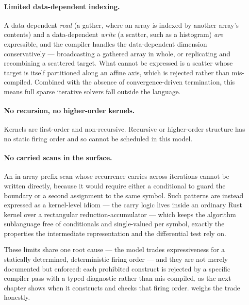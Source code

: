 \paragraph{Limited data-dependent indexing.} A data-dependent \emph{read} (a
gather, where an array is indexed by another array's contents) and a
data-dependent \emph{write} (a scatter, such as a histogram) \emph{are}
expressible, and the compiler handles the data-dependent dimension conservatively
--- broadcasting a gathered array in whole, or replicating and recombining a
scattered target. What cannot be expressed is a scatter whose target is itself
partitioned along an affine axis, which is rejected rather than mis-compiled.
Combined with the absence of convergence-driven termination, this means full
sparse iterative solvers fall outside the language.

\paragraph{No recursion, no higher-order kernels.} Kernels are first-order and
non-recursive. Recursive or higher-order structure has no static firing order
and so cannot be scheduled in this model.

\paragraph{No carried scans in the surface.} An in-array prefix scan whose
recurrence carries across iterations cannot be written directly, because it would
require either a conditional to guard the boundary or a second assignment to the
same symbol. Such patterns are instead expressed as a kernel-level idiom --- the
carry logic lives inside an ordinary Rust kernel over a rectangular
reduction-accumulator --- which keeps the algorithm sublanguage free of
conditionals and single-valued per symbol, exactly the properties the
intermediate representation and the differential test rely on.

These limits share one root cause --- the model trades expressiveness for a
statically determined, deterministic firing order --- and they are not merely
documented but enforced: each prohibited construct is rejected by a specific
compiler pass with a typed diagnostic rather than mis-compiled, as the next chapter
shows when it constructs and checks that firing order.  weighs
the trade honestly.
